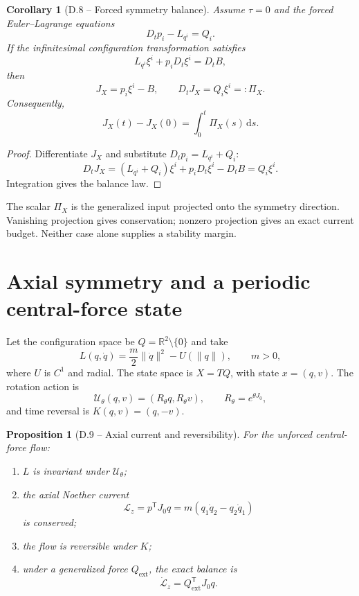 \documentclass[11pt,letterpaper]{article}
\theoremstyle{dynamicsstyle}
\newtheorem{proposition}[theorem]{Proposition}
\newtheorem{corollary}[theorem]{Corollary}
\newcommand{\R}{\mathbb{R}}
\newcommand{\dd}{\,\mathrm d}
\begin{document}
\begin{corollary}[D.8 -- Forced symmetry balance]\label{cor:balance}
Assume $\tau=0$ and the forced Euler--Lagrange equations
\[
D_tp_i-L_{q^i}=Q_i.
\]
If the infinitesimal configuration transformation satisfies
\[
L_{q^i}\xi^i+p_iD_t\xi^i=D_tB,
\]
then
\[
J_X=p_i\xi^i-B,
\qquad
D_tJ_X=Q_i\xi^i=:\Pi_X.
\]
Consequently,
\[
J_X(t)-J_X(0)=\int_0^t\Pi_X(s)\dd s.
\]
\end{corollary}

\begin{proof}
Differentiate $J_X$ and substitute $D_tp_i=L_{q^i}+Q_i$:
\[
D_tJ_X=(L_{q^i}+Q_i)\xi^i+p_iD_t\xi^i-D_tB=Q_i\xi^i.
\]
Integration gives the balance law.
\end{proof}

The scalar $\Pi_X$ is the generalized input projected onto the symmetry direction.  Vanishing projection gives conservation; nonzero projection gives an exact current budget.  Neither case alone supplies a stability margin.

\section{Axial symmetry and a periodic central-force state}\label{sec:orbit}

Let the configuration space be $Q=\R^2\setminus\{0\}$ and take
\[
L(q,\dot q)=\frac m2\|\dot q\|^2-U(\|q\|),
\qquad m>0,
\]
where $U$ is $C^1$ and radial.  The state space is $X=TQ$, with state $x=(q,v)$.  The rotation action is
\[
\mathcal U_\theta(q,v)=(R_\theta q,R_\theta v),
\qquad
R_\theta=e^{\theta J_0},
\]
and time reversal is $K(q,v)=(q,-v)$.

\begin{proposition}[D.9 -- Axial current and reversibility]\label{prop:axial}
For the unforced central-force flow:
\begin{enumerate}
  \item $L$ is invariant under $\mathcal U_\theta$;
  \item the axial Noether current
  \[
  \mathcal L_z=p^{\mathsf T}J_0q
  =m(q_1\dot q_2-q_2\dot q_1)
  \]
  is conserved;
  \item the flow is reversible under $K$;
  \item under a generalized force $Q_{\mathrm{ext}}$, the exact balance is
  \[
  \dot{\mathcal L}_z=Q_{\mathrm{ext}}^{\mathsf T}J_0q.
  \]
\end{enumerate}
\end{proposition}
\end{document}
